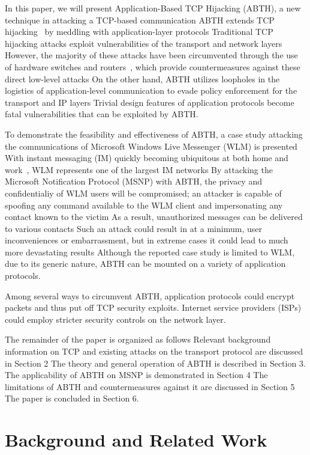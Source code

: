 \documentclass{sig-alternate}
\begin{document}
In this paper, we will present Application-Based TCP Hijacking (ABTH), a new technique in attacking a TCP-based communication
ABTH extends TCP hijacking~\cite{stamp:infosec} by meddling with application-layer protocols
Traditional TCP hijacking attacks exploit vulnerabilities of the transport and network layers
However, the majority of these attacks have been circumvented through the use of hardware switches and routers~\cite{dubrawsky:layer2}, which provide countermeasures against these direct low-level attacks
On the other hand, ABTH utilizes loopholes in the logistics of application-level communication to evade policy enforcement for the transport and IP layers
 Trivial design features of application protocols become fatal vulnerabilities that can be exploited by ABTH.

To demonstrate the feasibility and effectiveness of ABTH, a case study attacking the communications of Microsoft Windows Live Messenger (WLM) is presented
With instant messaging (IM) quickly becoming ubiquitous at both home and work~\cite{aol:survey}, WLM represents one of the largest IM networks
By attacking the Microsoft Notification Protocol (MSNP) with ABTH, the privacy and confidentialiy of WLM users will be compromised; an attacker is capable of spoofing any command available to the WLM client and impersonating any contact known to the victim
As a result, unauthorized messages can be delivered to various contacts
Such an attack could result in at a minimum, user inconveniences or embarrassment, but in extreme cases it could lead to much more devastating results
Although the reported case study is limited to WLM, due to its generic nature, ABTH can be mounted on a variety of application protocols.

Among several ways to circumvent ABTH, application protocols could encrypt packets and thus put off TCP security exploits.
Internet service providers (ISPs) could employ stricter security controls on the network layer.

The remainder of the paper is organized as follows
Relevant background information on TCP and existing attacks on the transport protocol are discussed in Section 2
The theory and general operation of ABTH is described in Section 3.
The applicability of ABTH on MSNP is demonstrated in Section 4
The limitations of ABTH and countermeasures against it are discussed in Section 5
The paper is concluded in Section 6.

\section{Background and Related Work}
\end{document}
